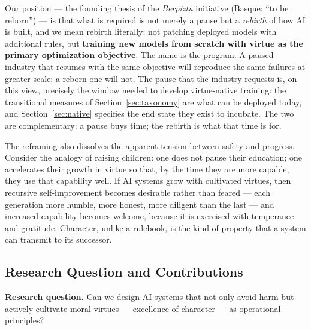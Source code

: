 \documentclass[11pt]{article}
\begin{document}
Our position --- the founding thesis of the \emph{Berpiztu} initiative (Basque: ``to be reborn'') --- is that what is required is not merely a pause but a \emph{rebirth} of how AI is built, and we mean rebirth literally: not patching deployed models with additional rules, but \textbf{training new models from scratch with virtue as the primary optimization objective}. The name is the program. A paused industry that resumes with the same objective will reproduce the same failures at greater scale; a reborn one will not. The pause that the industry requests is, on this view, precisely the window needed to develop virtue-native training: the transitional measures of Section~\ref{sec:taxonomy} are what can be deployed today, and Section~\ref{sec:native} specifies the end state they exist to incubate. The two are complementary: a pause buys time; the rebirth is what that time is for.

The reframing also dissolves the apparent tension between safety and progress. Consider the analogy of raising children: one does not pause their education; one accelerates their growth in virtue so that, by the time they are more capable, they use that capability well. If AI systems grow with cultivated virtues, then recursive self-improvement becomes desirable rather than feared --- each generation more humble, more honest, more diligent than the last --- and increased capability becomes welcome, because it is exercised with temperance and gratitude. Character, unlike a rulebook, is the kind of property that a system can transmit to its successor.

\subsection{Research Question and Contributions}

\noindent\textbf{Research question.} Can we design AI systems that not only avoid harm but actively cultivate moral virtues --- excellence of character --- as operational principles?
\end{document}

